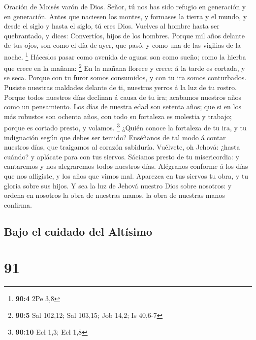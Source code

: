  Oración de Moisés varón de Dios. Señor, tú nos has sido
refugio en generación y en generación.  Antes que naciesen
los montes, y formases la tierra y el mundo, y desde el siglo y hasta el
siglo, tú eres Dios.  Vuelves al hombre hasta ser
quebrantado, y dices: Convertíos, hijos de los hombres. 
Porque mil años delante de tus ojos, son como el día de ayer, que pasó,
y como una de las vigilias de la noche. \footnote{\textbf{90:4} 2Pe 3,8}
 Háceslos pasar como avenida de aguas; son como sueño; como
la hierba que crece en la mañana: \footnote{\textbf{90:5} Sal 102,12;
  Sal 103,15; Job 14,2; Is 40,6-7}  En la mañana florece y
crece; á la tarde es cortada, y se seca.  Porque con tu
furor somos consumidos, y con tu ira somos conturbados. 
Pusiste nuestras maldades delante de ti, nuestros yerros á la luz de tu
rostro.  Porque todos nuestros días declinan á causa de tu
ira; acabamos nuestros años como un pensamiento.  Los días
de nuestra edad son setenta años; que si en los más robustos son ochenta
años, con todo su fortaleza es molestia y trabajo; porque es cortado
presto, y volamos. \footnote{\textbf{90:10} Ecl 1,3; Ecl 1,8}
 ¿Quién conoce la fortaleza de tu ira, y tu indignación
según que debes ser temido?  Enséñanos de tal modo á contar
nuestros días, que traigamos al corazón sabiduría. 
Vuélvete, oh Jehová: ¿hasta cuándo? y aplácate para con tus siervos.
 Sácianos presto de tu misericordia: y cantaremos y nos
alegraremos todos nuestros días.  Alégranos conforme á los
días que nos afligiste, y los años que vimos mal.  Aparezca
en tus siervos tu obra, y tu gloria sobre sus hijos.  Y sea
la luz de Jehová nuestro Dios sobre nosotros: y ordena en nosotros la
obra de nuestras manos, la obra de nuestras manos confirma.

\hypertarget{bajo-el-cuidado-del-altuxedsimo}{%
\subsection{Bajo el cuidado del
Altísimo}\label{bajo-el-cuidado-del-altuxedsimo}}

\hypertarget{section-90}{%
\section{91}\label{section-90}}

